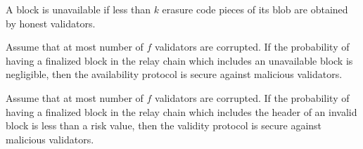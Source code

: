 \begin{definition}\label{def:unavail}
A block is unavailable if less than $k$ erasure code pieces of its blob are obtained by honest validators.
\end{definition}


\begin{definition}
Assume that at most number of $f$ validators are corrupted. If the probability of having a finalized block in the relay chain which includes an unavailable block is negligible, then the availability protocol is secure against malicious validators.
\end{definition}

\begin{definition}
Assume that  at most number of $f$ validators are corrupted. If the probability of having a finalized block in the relay chain which includes the header of an invalid block is less than a risk value, then the validity protocol is secure against malicious validators.
\end{definition}






